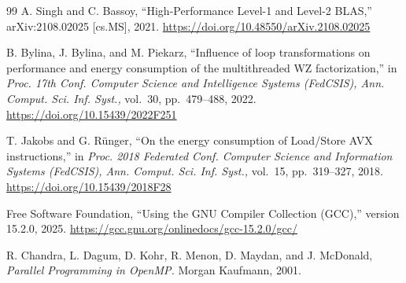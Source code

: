 \documentclass[conference]{IEEEtran}
\begin{document}
\begin{thebibliography}{99}
A. Singh and C. Bassoy,
``High-Performance Level-1 and Level-2 BLAS,''
arXiv:2108.02025 [cs.MS], 2021.
\url{https://doi.org/10.48550/arXiv.2108.02025}

B. Bylina, J. Bylina, and M. Piekarz,
``Influence of loop transformations on performance and energy consumption of the multithreaded WZ factorization,''
in \textit{Proc. 17th Conf. Computer Science and Intelligence Systems (FedCSIS),
Ann. Comput. Sci. Inf. Syst.,} vol.~30, pp.~479--488, 2022.
\url{https://doi.org/10.15439/2022F251}

T. Jakobs and G. R\"unger,
``On the energy consumption of Load/Store AVX instructions,''
in \textit{Proc. 2018 Federated Conf. Computer Science and Information Systems (FedCSIS),
Ann. Comput. Sci. Inf. Syst.,} vol.~15, pp.~319--327, 2018.
\url{https://doi.org/10.15439/2018F28}

Free Software Foundation,
``Using the GNU Compiler Collection (GCC),'' version 15.2.0, 2025.
\url{https://gcc.gnu.org/onlinedocs/gcc-15.2.0/gcc/}

R. Chandra, L. Dagum, D. Kohr, R. Menon, D. Maydan, and J. McDonald,
\textit{Parallel Programming in OpenMP.}
Morgan Kaufmann, 2001.

\end{thebibliography}


% 
\end{document}
